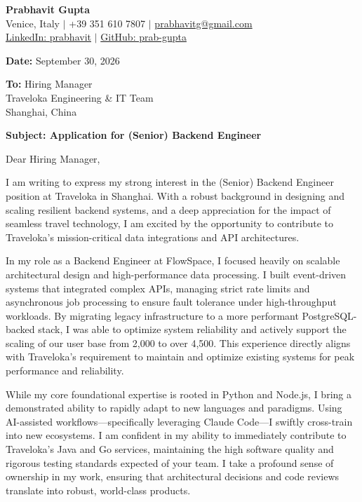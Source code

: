 \documentclass[11pt,a4paper]{article}
\begin{document}
\begin{center}
    \textbf{\LARGE Prabhavit Gupta} \\
    \vspace{2mm}
    Venice, Italy $\vert$ +39 351 610 7807 $\vert$ \href{mailto:prabhavitg@gmail.com}{prabhavitg@gmail.com} \\
    \href{https://www.linkedin.com/in/prabhavit/}{LinkedIn: prabhavit} $\vert$ \href{https://github.com/prab-gupta}{GitHub: prab-gupta}
\end{center}

\vspace{5mm}

\noindent
\textbf{Date:} September 30, 2026

\noindent
\textbf{To:} Hiring Manager \\
Traveloka Engineering \& IT Team \\
Shanghai, China

\vspace{5mm}

\noindent
\textbf{Subject: Application for (Senior) Backend Engineer}

\vspace{5mm}

\noindent
Dear Hiring Manager,

\noindent
I am writing to express my strong interest in the (Senior) Backend Engineer position at Traveloka in Shanghai. With a robust background in designing and scaling resilient backend systems, and a deep appreciation for the impact of seamless travel technology, I am excited by the opportunity to contribute to Traveloka's mission-critical data integrations and API architectures.

\noindent
In my role as a Backend Engineer at FlowSpace, I focused heavily on scalable architectural design and high-performance data processing. I built event-driven systems that integrated complex APIs, managing strict rate limits and asynchronous job processing to ensure fault tolerance under high-throughput workloads. By migrating legacy infrastructure to a more performant PostgreSQL-backed stack, I was able to optimize system reliability and actively support the scaling of our user base from 2,000 to over 4,500. This experience directly aligns with Traveloka's requirement to maintain and optimize existing systems for peak performance and reliability.

\noindent
While my core foundational expertise is rooted in Python and Node.js, I bring a demonstrated ability to rapidly adapt to new languages and paradigms. Using AI-assisted workflows---specifically leveraging Claude Code---I swiftly cross-train into new ecosystems. I am confident in my ability to immediately contribute to Traveloka's Java and Go services, maintaining the high software quality and rigorous testing standards expected of your team. I take a profound sense of ownership in my work, ensuring that architectural decisions and code reviews translate into robust, world-class products.
\end{document}
